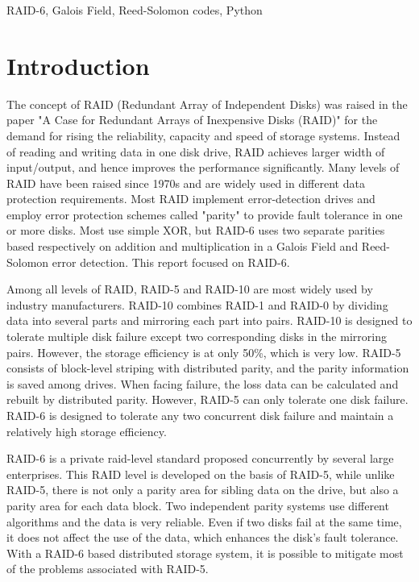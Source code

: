 \documentclass[conference]{IEEEtran}
\begin{document}
\begin{IEEEkeywords}
RAID-6, Galois Field, Reed-Solomon codes, Python 
\end{IEEEkeywords}

\section{Introduction}
The concept of RAID (Redundant Array of Independent Disks) was raised in the paper "A Case for Redundant Arrays of Inexpensive Disks (RAID)" for the demand for rising the reliability, capacity and speed of storage systems. Instead of reading and writing data in one disk drive, RAID achieves larger width of input/output, and hence improves the performance significantly. Many levels of RAID have been raised since 1970s and are widely used in different data protection requirements. Most RAID implement error-detection drives and employ error protection schemes called "parity" to provide fault tolerance in one or more disks. Most use simple XOR, but RAID-6 uses two separate parities based respectively on addition and multiplication in a Galois Field and Reed-Solomon error detection. This report focused on RAID-6.

Among all levels of RAID, RAID-5 and RAID-10 are most widely used by industry manufacturers. RAID-10 combines RAID-1 and RAID-0 by dividing data into several parts and mirroring each part into pairs. RAID-10 is designed to tolerate multiple disk failure except two corresponding disks in the mirroring pairs. However, the storage efficiency is at only 50\%, which is very low. RAID-5 consists of block-level striping with distributed parity, and the parity information is saved among drives. When facing failure, the loss data can be calculated and rebuilt by distributed parity. However, RAID-5 can only tolerate one disk failure. RAID-6 is designed to tolerate any two concurrent disk failure and maintain a relatively high storage efficiency.

RAID-6 is a private raid-level standard proposed concurrently by several large enterprises. This RAID level is developed on the basis of RAID-5, while unlike RAID-5, there is not only a parity area for sibling data on the drive, but also a parity area for each data block. Two independent parity systems use different algorithms and the data is very reliable. Even if two disks fail at the same time, it does not affect the use of the data, which enhances the disk’s fault tolerance. With a RAID-6 based distributed storage system, it is possible to mitigate most of the problems associated with RAID-5.
\end{document}
